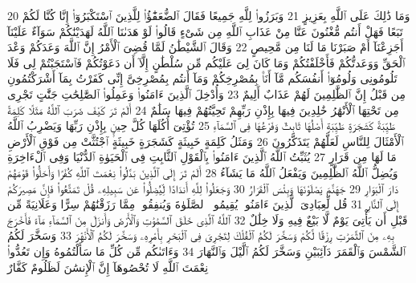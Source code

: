 {\tiny\colorbox{cl_aya}{20}} وَمَا ذَٰلِكَ عَلَى ٱللَّهِ بِعَزِيزٍ
{\tiny\colorbox{cl_aya}{21}} وَبَرَزُوا۟ لِلَّهِ جَمِيعًا فَقَالَ ٱلضُّعَفَٰٓؤُا۟ لِلَّذِينَ ٱسْتَكْبَرُوٓا۟ إِنَّا كُنَّا لَكُمْ تَبَعًا فَهَلْ أَنتُم مُّغْنُونَ عَنَّا مِنْ عَذَابِ ٱللَّهِ مِن شَىْءٍ قَالُوا۟ لَوْ هَدَىٰنَا ٱللَّهُ لَهَدَيْنَٰكُمْ سَوَآءٌ عَلَيْنَآ أَجَزِعْنَآ أَمْ صَبَرْنَا مَا لَنَا مِن مَّحِيصٍ
{\tiny\colorbox{cl_aya}{22}} وَقَالَ ٱلشَّيْطَٰنُ لَمَّا قُضِىَ ٱلْأَمْرُ إِنَّ ٱللَّهَ وَعَدَكُمْ وَعْدَ ٱلْحَقِّ وَوَعَدتُّكُمْ فَأَخْلَفْتُكُمْ وَمَا كَانَ لِىَ عَلَيْكُم مِّن سُلْطَٰنٍ إِلَّآ أَن دَعَوْتُكُمْ فَٱسْتَجَبْتُمْ لِى فَلَا تَلُومُونِى وَلُومُوٓا۟ أَنفُسَكُم مَّآ أَنَا۠ بِمُصْرِخِكُمْ وَمَآ أَنتُم بِمُصْرِخِىَّ إِنِّى كَفَرْتُ بِمَآ أَشْرَكْتُمُونِ مِن قَبْلُ إِنَّ ٱلظَّٰلِمِينَ لَهُمْ عَذَابٌ أَلِيمٌ
{\tiny\colorbox{cl_aya}{23}} وَأُدْخِلَ ٱلَّذِينَ ءَامَنُوا۟ وَعَمِلُوا۟ ٱلصَّٰلِحَٰتِ جَنَّٰتٍ تَجْرِى مِن تَحْتِهَا ٱلْأَنْهَٰرُ خَٰلِدِينَ فِيهَا بِإِذْنِ رَبِّهِمْ تَحِيَّتُهُمْ فِيهَا سَلَٰمٌ
{\tiny\colorbox{cl_aya}{24}} أَلَمْ تَرَ كَيْفَ ضَرَبَ ٱللَّهُ مَثَلًا كَلِمَةً طَيِّبَةً كَشَجَرَةٍ طَيِّبَةٍ أَصْلُهَا ثَابِتٌ وَفَرْعُهَا فِى ٱلسَّمَآءِ
{\tiny\colorbox{cl_aya}{25}} تُؤْتِىٓ أُكُلَهَا كُلَّ حِينٍۭ بِإِذْنِ رَبِّهَا وَيَضْرِبُ ٱللَّهُ ٱلْأَمْثَالَ لِلنَّاسِ لَعَلَّهُمْ يَتَذَكَّرُونَ
{\tiny\colorbox{cl_aya}{26}} وَمَثَلُ كَلِمَةٍ خَبِيثَةٍ كَشَجَرَةٍ خَبِيثَةٍ ٱجْتُثَّتْ مِن فَوْقِ ٱلْأَرْضِ مَا لَهَا مِن قَرَارٍ
{\tiny\colorbox{cl_aya}{27}} يُثَبِّتُ ٱللَّهُ ٱلَّذِينَ ءَامَنُوا۟ بِٱلْقَوْلِ ٱلثَّابِتِ فِى ٱلْحَيَوٰةِ ٱلدُّنْيَا وَفِى ٱلْءَاخِرَةِ وَيُضِلُّ ٱللَّهُ ٱلظَّٰلِمِينَ وَيَفْعَلُ ٱللَّهُ مَا يَشَآءُ
{\tiny\colorbox{cl_aya}{28}} أَلَمْ تَرَ إِلَى ٱلَّذِينَ بَدَّلُوا۟ نِعْمَتَ ٱللَّهِ كُفْرًا وَأَحَلُّوا۟ قَوْمَهُمْ دَارَ ٱلْبَوَارِ
{\tiny\colorbox{cl_aya}{29}} جَهَنَّمَ يَصْلَوْنَهَا وَبِئْسَ ٱلْقَرَارُ
{\tiny\colorbox{cl_aya}{30}} وَجَعَلُوا۟ لِلَّهِ أَندَادًا لِّيُضِلُّوا۟ عَن سَبِيلِهِۦ قُلْ تَمَتَّعُوا۟ فَإِنَّ مَصِيرَكُمْ إِلَى ٱلنَّارِ
{\tiny\colorbox{cl_aya}{31}} قُل لِّعِبَادِىَ ٱلَّذِينَ ءَامَنُوا۟ يُقِيمُوا۟ ٱلصَّلَوٰةَ وَيُنفِقُوا۟ مِمَّا رَزَقْنَٰهُمْ سِرًّا وَعَلَانِيَةً مِّن قَبْلِ أَن يَأْتِىَ يَوْمٌ لَّا بَيْعٌ فِيهِ وَلَا خِلَٰلٌ
{\tiny\colorbox{cl_aya}{32}} ٱللَّهُ ٱلَّذِى خَلَقَ ٱلسَّمَٰوَٰتِ وَٱلْأَرْضَ وَأَنزَلَ مِنَ ٱلسَّمَآءِ مَآءً فَأَخْرَجَ بِهِۦ مِنَ ٱلثَّمَرَٰتِ رِزْقًا لَّكُمْ وَسَخَّرَ لَكُمُ ٱلْفُلْكَ لِتَجْرِىَ فِى ٱلْبَحْرِ بِأَمْرِهِۦ وَسَخَّرَ لَكُمُ ٱلْأَنْهَٰرَ
{\tiny\colorbox{cl_aya}{33}} وَسَخَّرَ لَكُمُ ٱلشَّمْسَ وَٱلْقَمَرَ دَآئِبَيْنِ وَسَخَّرَ لَكُمُ ٱلَّيْلَ وَٱلنَّهَارَ
{\tiny\colorbox{cl_aya}{34}} وَءَاتَىٰكُم مِّن كُلِّ مَا سَأَلْتُمُوهُ وَإِن تَعُدُّوا۟ نِعْمَتَ ٱللَّهِ لَا تُحْصُوهَآ إِنَّ ٱلْإِنسَٰنَ لَظَلُومٌ كَفَّارٌ
